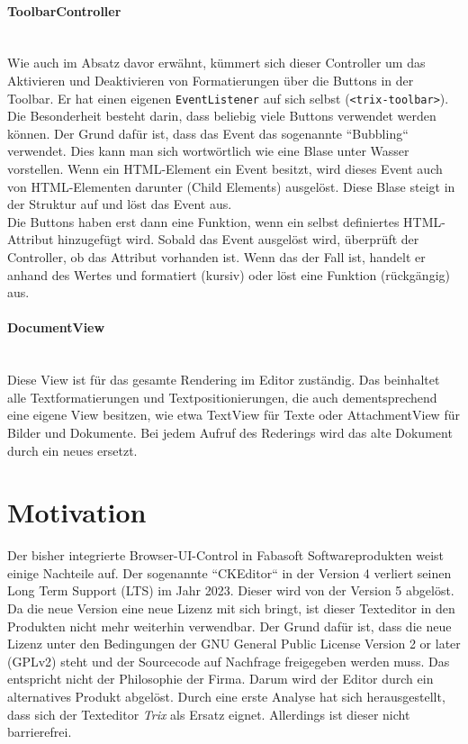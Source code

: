\paragraph{ToolbarController}\mbox{}\\
Wie auch im Absatz davor erwähnt, kümmert sich dieser Controller um das Aktivieren und Deaktivieren von Formatierungen über die Buttons in der Toolbar. Er hat einen eigenen \texttt{EventListener} auf sich selbst (\texttt{<trix-toolbar>}). Die Besonderheit besteht darin, dass beliebig viele Buttons verwendet werden können. Der Grund dafür ist, dass das Event das sogenannte ``Bubbling`` verwendet. Dies kann man sich wortwörtlich wie eine Blase unter Wasser vorstellen. Wenn ein HTML-Element ein Event besitzt, wird dieses Event auch von HTML-Elementen darunter (Child Elements) ausgelöst. Diese Blase steigt in der Struktur auf und löst das Event aus.\\
Die Buttons haben erst dann eine Funktion, wenn ein selbst definiertes HTML-Attribut hinzugefügt wird. Sobald das Event ausgelöst wird, überprüft der Controller, ob das Attribut vorhanden ist. Wenn das der Fall ist, handelt er anhand des Wertes und formatiert (kursiv) oder löst eine Funktion (rückgängig) aus.

\paragraph{DocumentView}\mbox{}\\
Diese View ist für das gesamte Rendering im Editor zuständig. Das beinhaltet alle Textformatierungen und Textpositionierungen, die auch dementsprechend eine eigene View besitzen, wie etwa TextView für Texte oder AttachmentView für Bilder und Dokumente. Bei jedem Aufruf des Rederings wird das alte Dokument durch ein neues ersetzt.

\section{Motivation}
Der bisher integrierte Browser-UI-Control in Fabasoft Softwareprodukten weist einige Nachteile auf. Der sogenannte ``CKEditor`` \cite{ckeditor_v4_2020} in der Version 4 verliert seinen Long Term Support (LTS) im Jahr 2023. Dieser wird von der Version 5 \cite{ckeditor_v5_2020} abgelöst. Da die neue Version eine neue Lizenz mit sich bringt, ist dieser Texteditor in den Produkten nicht mehr weiterhin verwendbar. Der Grund dafür ist, dass die neue Lizenz unter den Bedingungen der GNU General Public License Version 2 or later (GPLv2) steht und der Sourcecode auf Nachfrage freigegeben werden muss. Das entspricht nicht der Philosophie der Firma. Darum wird der Editor durch ein alternatives Produkt abgelöst. Durch eine erste Analyse hat sich herausgestellt, dass sich der Texteditor {\em{Trix}} als Ersatz eignet. Allerdings ist dieser nicht barrierefrei.

